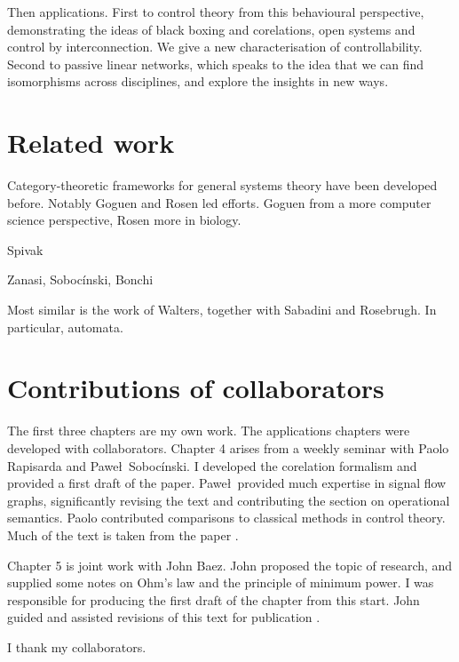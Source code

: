 Then applications. First to control theory from this behavioural perspective,
demonstrating the ideas of black boxing and corelations, open systems and
control by interconnection. We give a new characterisation of controllability.
Second to passive linear networks, which speaks to the idea that we can find
isomorphisms across disciplines, and explore the insights in new ways.

\section{Related work}

Category-theoretic frameworks for general systems theory have been developed
before. Notably Goguen and Rosen led efforts. Goguen from a more computer
science perspective, Rosen more in biology.



Spivak 

Zanasi, Soboc\'inski, Bonchi

Most similar is the work of Walters, together with Sabadini and Rosebrugh. In
particular, automata.

\section{Contributions of collaborators}

The first three chapters are my own work. The applications chapters were
developed with collaborators. Chapter 4 arises from a weekly seminar with Paolo
Rapisarda and Pawe\l\ Soboc\'inski. I developed the corelation formalism and provided a
first draft of the paper. Pawe\l\ provided much expertise in signal flow graphs,
significantly revising the text and contributing the section on operational
semantics. Paolo contributed comparisons to classical methods in control theory. 
Much of the text is taken from the paper \cite{FonRapSob16}.

Chapter 5 is joint work with John Baez. John proposed the topic of research, and
supplied some notes on Ohm's law and the principle of minimum power. I
was responsible for producing the first draft of the chapter from this start.
John guided and assisted revisions of this text for publication \cite{BaeFon16}.

I thank my collaborators.
